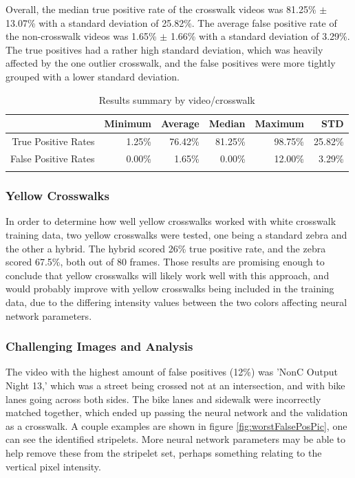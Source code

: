 \documentclass[12pt]{ucthesis}
\begin{document}
Overall, the median true positive rate of the crosswalk videos was 81.25\% $\pm$ 13.07\% with a standard deviation of 25.82\%. The average false positive rate of the non-crosswalk videos was 1.65\% $\pm$ 1.66\% with a standard deviation of 3.29\%.
The true positives had a rather high standard deviation, which was heavily affected by the one outlier crosswalk, and the false positives were more tightly grouped with a lower standard deviation.

\begin{table}[t]
    \begin{longtable}[t]{|r|r|r|r|r|r|}
    \hline
       & Minimum & Average & Median & Maximum & STD \bigstrut\\
    \hline
    True Positive Rates & 1.25\% & 76.42\% & 81.25\% & 98.75\% & 25.82\% \bigstrut\\
    \hline
    False Positive Rates & 0.00\% & 1.65\% & 0.00\% & 12.00\% & 3.29\% \bigstrut\\
    \hline


    \caption{Results summary by video/crosswalk}
    \label{tab:crosswalkResultsSummary} 
    \end{longtable}
\end{table}

\subsubsection{Yellow Crosswalks}

In order to determine how well yellow crosswalks worked with white crosswalk training data, two yellow crosswalks were tested, one being a standard zebra and the other a hybrid. The hybrid scored 26\% true positive rate, and the zebra scored 67.5\%, both out of 80 frames. Those results are promising enough to conclude that yellow crosswalks will likely work well with this approach, and would probably improve with yellow crosswalks being included in the training data, due to the differing intensity values between the two colors affecting neural network parameters. 

\subsubsection{Challenging Images and Analysis}

The video with the highest amount of false positives (12\%) was 'NonC Output Night 13,' which was a street being crossed not at an intersection, and with bike lanes going across both sides. The bike lanes and sidewalk were incorrectly matched together, which ended up passing the neural network and the validation as a crosswalk. A couple examples are shown in figure \ref{fig:worstFalsePosPic}, one can see the identified stripelets. More neural network parameters may be able to help remove these from the stripelet set, perhaps something relating to the vertical pixel intensity. 
\end{document}
